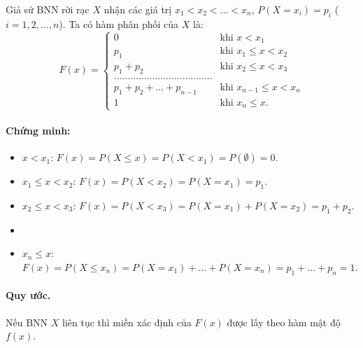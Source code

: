 \begin{nhanxet}
Giả sử BNN rời rạc $X$ nhận các giá trị $x_1 < x_2 < \dots < x_n$, $P(X = x_i) = p_i$ ($i = 1, 2, \dots, n$).
Ta có hàm phân phối của $X$ là:
\[
F(x) = \begin{cases}
0 & \text{khi } x < x_1 \\
p_1 & \text{khi } x_1 \le x < x_2 \\
p_1 + p_2 & \text{khi } x_2 \le x < x_3 \\
\dots\dots\dots\dots\dots\dots\dots\dots\dots\dots\dots\dots \\
p_1 + p_2 + \dots + p_{n-1} & \text{khi } x_{n-1} \le x < x_n \\
1 & \text{khi } x_n \le x.
\end{cases}
\]

\paragraph{Chứng minh:}
\begin{itemize}
    \item $x < x_1$: $F(x) = P(X \le x) = P(X < x_1) = P(\emptyset) = 0$.
    \item $x_1 \le x < x_2$: $F(x) = P(X < x_2) = P(X = x_1) = p_1$.
    \item $x_2 \le x < x_3$: $F(x) = P(X < x_3) = P(X = x_1) + P(X = x_2) = p_1 + p_2$.
    \item[\dots] \dotfill
    \item $x_n \le x$: $F(x) = P(X \le x_n) = P(X = x_1) + \dots + P(X = x_n) = p_1 + \dots + p_n = 1$.
\end{itemize}
\end{nhanxet}

\paragraph{Quy ước.} Nếu BNN $X$ liên tục thì miền xác định của $F(x)$ được lấy theo hàm mật độ $f(x)$.

